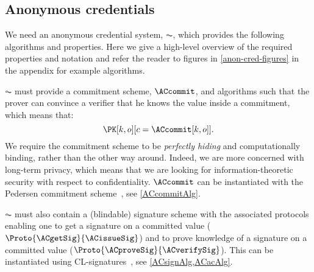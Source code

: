 \subsection{Anonymous credentials}%
\label{ZK-anon-cred}\label{anon-cred}


We need an anonymous credential system, \(\AC\), which provides the following algorithms and properties.
Here we give a high-level overview of the required properties and notation and 
refer the reader to figures in \cref{anon-cred-figures} in the appendix for 
example algorithms.

\(\AC\) must provide a commitment scheme, \(\ACcommit\), and algorithms such that the prover can convince a verifier that he knows the value inside a commitment, which means that:
\begin{equation*}
  \PK[k, o][c = \ACcommit[k,o]].
\end{equation*}
We require the commitment scheme to be \emph{perfectly hiding} and computationally binding, rather than the other way around.
Indeed, we are more concerned with long-term privacy, which means that we are looking for information-theoretic security with respect to confidentiality.
\(\ACcommit\) can be instantiated with the Pedersen commitment 
scheme~\cite{PedersenCommitment}, see \cref{ACcommitAlg}.


\(\AC\) must also contain a (blindable) signature scheme with the associated 
protocols enabling one to get a signature on a committed value 
(\(\Proto{\ACgetSig}{\ACissueSig}\)) and to prove knowledge of a signature on a 
committed value (\(\Proto{\ACproveSig}{\ACverifySig}\)).
This can be instantiated using CL-signatures~\cite{CLsignatures}, see 
\cref{ACsignAlg,ACacAlg}.

